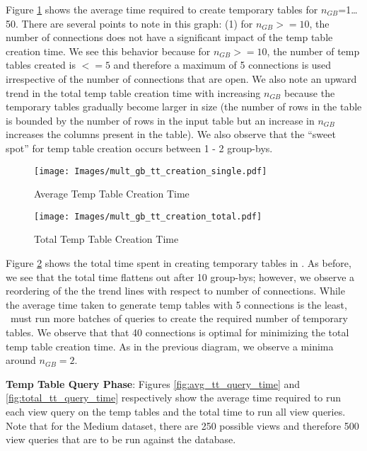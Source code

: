 Figure \ref{fig:avg_tt_creation} shows the
average time required to create temporary tables for $n_{GB}$=1\ldots50. There
are several points to note in this graph: (1) for $n_{GB}>=10$, the number of
connections does not have a significant impact of the temp table creation time.
We see this behavior because for $n_{GB}>=10$, the number of temp tables created
is $<=5$ and therefore a maximum of 5 connections is used irrespective of the
number of connections that are open.
We also note an upward trend in the total temp table creation time with
increasing $n_{GB}$ because the temporary tables gradually become larger in size
(the number of rows in the table is bounded by the number of rows in the input
table but an increase in $n_{GB}$ increases the columns present in the table).
We also observe that the ``sweet spot'' for temp table creation occurs between 1 -
2 group-bys. 


\begin{figure}[h]
  \centering
    \texttt{[image: Images/mult\_gb\_tt\_creation\_single.pdf]} 
  \caption{Average Temp Table Creation Time} 
    \label{fig:avg_tt_creation}
\end{figure}

\begin{figure}[h]
  \centering
    \texttt{[image: Images/mult\_gb\_tt\_creation\_total.pdf]}
  \caption{Total Temp Table Creation Time} 
    \label{fig:total_tt_creation_time}
\end{figure}

Figure \ref{fig:total_tt_creation_time} shows the total time spent in creating
temporary tables in \SeeDB. As before, we see that the total time
flattens out after 10 group-bys; however, we observe a reordering of the the
trend lines with respect to number of connections. While the average time taken
to generate temp tables with 5 connections is the least, \SeeDB\ must run more
batches of queries to create the required number of temporary tables. We observe
that that 40 connections is optimal for minimizing the total temp table creation
time. As in the previous diagram, we observe a minima around $n_{GB}=2$.

{\bf Temp Table Query Phase}: Figures \ref{fig:avg_tt_query_time} and
\ref{fig:total_tt_query_time} respectively show the average time required to run
each view query on the temp tables and the total time to run all view queries.
Note that for the Medium dataset, there are 250 possible views and therefore 500
view queries that are to be run against the database.

